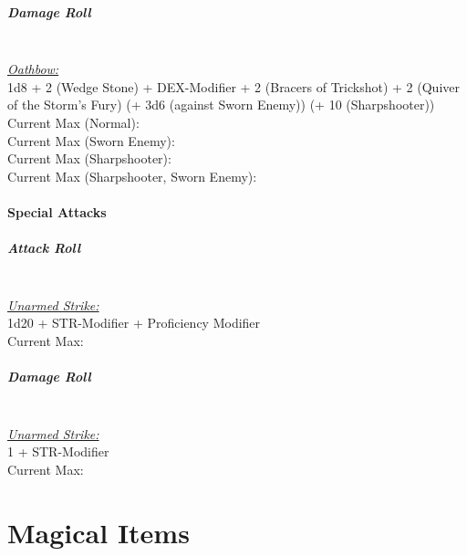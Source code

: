 \documentclass[letterpaper,openany,oneside,twocolumn]{book}
\begin{document}
\paragraph*{Damage Roll}\hfill\\
\underline{\textit{Oathbow:}}\\
1d8 + 2 (Wedge Stone) + DEX-Modifier + 2 (Bracers of Trickshot) + 2 (Quiver of the Storm's Fury) (+ 3d6 (against Sworn Enemy)) (+ 10 (Sharpshooter))\\
\indent Current Max (Normal):  \\
\indent Current Max (Sworn Enemy):  \\
\indent Current Max (Sharpshooter):  \\
\indent Current Max (Sharpshooter, Sworn Enemy): 
\subsubsection*{Special Attacks}
\paragraph*{Attack Roll}\hfill\\
\underline{\textit{Unarmed Strike:}}\\
1d20 + STR-Modifier + Proficiency Modifier\\
\indent Current Max: 
\paragraph*{Damage Roll}\hfill\\
\underline{\textit{Unarmed Strike:}}\\
1 + STR-Modifier\\
\indent Current Max: 

\chapter*{Magical Items}
\end{document}
